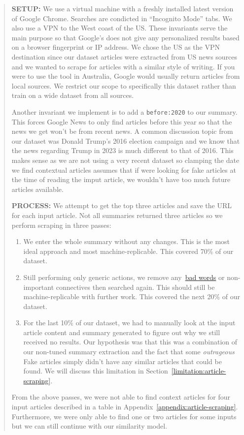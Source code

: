 \documentclass{article}
\begin{document}
\begin{quote}
  \textbf{SETUP:} We use a virtual machine with a freshly installed latest version of Google Chrome. Searches are condicted in ``Incognito Mode'' tabs. We also use a VPN to the West coast of the US. These invariants serve the main purpose so that Google's does not give any personalized results based on a browser fingerprint or IP address. We chose the US as the VPN destination since our dataset articles were extracted from US news sources and we wanted to scrape for articles with a similar style of writing. If you were to use the tool in Australia, Google would usually return articles from local sources. We restrict our scope to specifically this dataset rather than train on a wide dataset from all sources.

  Another invariant we implement is to add a \verb|before:2020| to our summary. This forces Google News to only find articles before this year so that the news we get won't be from recent news. A common discussion topic from our dataset was Donald Trump's 2016 election campaign and we know that the news regarding Trump in 2023 is much different to that of 2016. This makes sense as we are not using a very recent dataset so clamping the date we find contextual articles assumes that if were looking for fake articles at the time of reading the imput article, we wouldn't have too much future articles available.

  \textbf{PROCESS:} We attempt to get the top three articles and save the URL for each input article. Not all summaries returned three articles so we perform scraping in three passes:
  \begin{enumerate}
    \item We enter the whole summary without any changes. This is the most ideal approach and most machine-replicable. This covered 70\% of our dataset.
    \item Still performing only generic actions, we remove any~\hyperref[summary-extraction:bad-words]{\color{blue}bad words} or non-important connectives then searched again. This should still be machine-replicable with further work. This covered the next 20\% of our dataset.
    \item For the last 10\% of our dataset, we had to manually look at the input article content and summary generated to figure out why we still received no results. Our hypothesis was that this was a combination of our non-tuned summary extraction and the fact that some \emph{outrageous} Fake articles simply didn't have any similar articles that could be found. We will discuss this limitation in Section~\ref{limitation:article-scraping}.
  \end{enumerate}
  From the above passes, we were not able to find context articles for four input articles described in a table in Appendix~\ref{appendix:article-scraping}. Furthermore, we were only able to find one or two articles for some inputs but we can still continue with our similarity model.
\end{quote}
\end{document}
